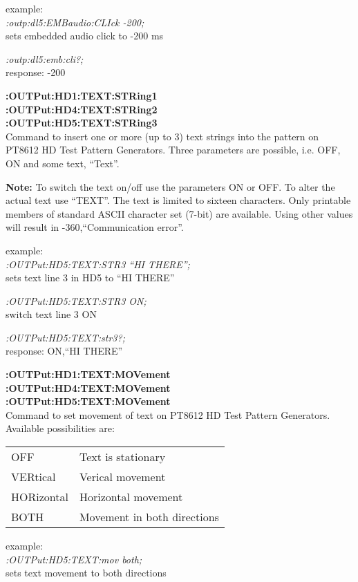 example:\\
\textit{:outp:dl5:EMBaudio:CLIck -200;}\\
sets embedded audio click to -200 ms

\textit{:outp:dl5:emb:cli?;}\\
response: -200

\textbf{:OUTPut:HD1:TEXT:STRing1}\\
\textbf{:OUTPut:HD4:TEXT:STRing2}\\
\textbf{:OUTPut:HD5:TEXT:STRing3}\\
Command to insert one or more (up to 3) text strings into the pattern on PT8612 HD Test Pattern Generators. Three parameters are possible, i.e. OFF, ON and some text, ``Text''.

\textbf{Note:} To switch the text on/off use the parameters ON or OFF. To alter the actual text use ``TEXT''. The text is limited to sixteen characters. Only printable members of standard ASCII character set (7-bit) are available.  Using other values will result in -360,``Communication error''.

example:\\
\textit{:OUTPut:HD5:TEXT:STR3 ``HI THERE'';}\\
sets text line 3 in HD5 to ``HI THERE''

\textit{:OUTPut:HD5:TEXT:STR3 ON;}\\
switch text line 3 ON

\textit{:OUTPut:HD5:TEXT:str3?;}\\
response: ON,``HI THERE''

\textbf{:OUTPut:HD1:TEXT:MOVement}\\
\textbf{:OUTPut:HD4:TEXT:MOVement}\\
\textbf{:OUTPut:HD5:TEXT:MOVement}\\
Command to set movement of text on PT8612 HD Test Pattern Generators. Available possibilities are:

\begin{tabular}{l l}
OFF       &   Text is stationary\\
VERtical  &   Verical movement\\
HORizontal&   Horizontal movement\\
BOTH      &   Movement in both directions \\
\end{tabular}

example:\\
\textit{:OUTPut:HD5:TEXT:mov both;}\\
sets text movement to both directions

